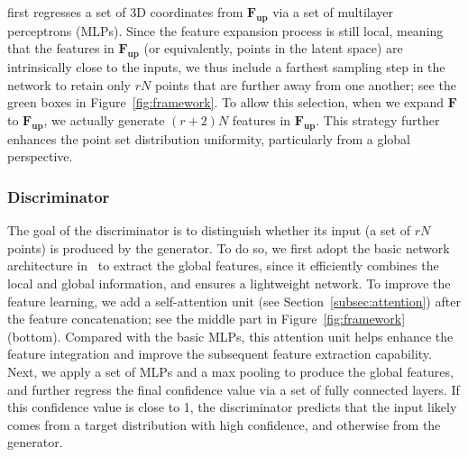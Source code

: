  first regresses a set of 3D coordinates from $\mathbf{F_{\text{up}}}$ via a set of multilayer perceptrons (MLPs).
%
Since the feature expansion process is still local, meaning that the features in $\mathbf{F_{\text{up}}}$ (or equivalently, points in the latent space) are intrinsically close to the inputs, we thus include a farthest sampling step in the network to retain only $rN$ points that are further away from one another; see the green boxes in Figure~\ref{fig:framework}.
To allow this selection, when we expand $\mathbf{F}$ to $\mathbf{F_{\text{up}}}$, we actually generate $(r+2)N$ features in  $\mathbf{F_{\text{up}}}$.
This strategy further enhances the point set distribution uniformity, particularly from a global perspective.
%

\subsubsection{Discriminator}
The goal of the discriminator is to distinguish whether its input (a set of $rN$ points) is produced by the generator.
To do so, we first adopt the basic network architecture in~\cite{yuan2018pcn} to extract the global features, since it efficiently combines the local and global information, and ensures a lightweight network.
%
To improve the feature learning, we add a self-attention unit (see Section~\ref{subsec:attention}) after the feature concatenation; see the middle part in Figure~\ref{fig:framework} (bottom).
Compared with the basic MLPs, this attention unit helps enhance the feature integration and improve the subsequent feature extraction capability.
%
Next, we apply a set of MLPs and a max pooling to produce the global features, and further regress the final confidence value via a set of fully connected layers.
If this confidence value is close to 1, the discriminator predicts that the input likely comes from a target distribution with high confidence, and otherwise from the generator.%



